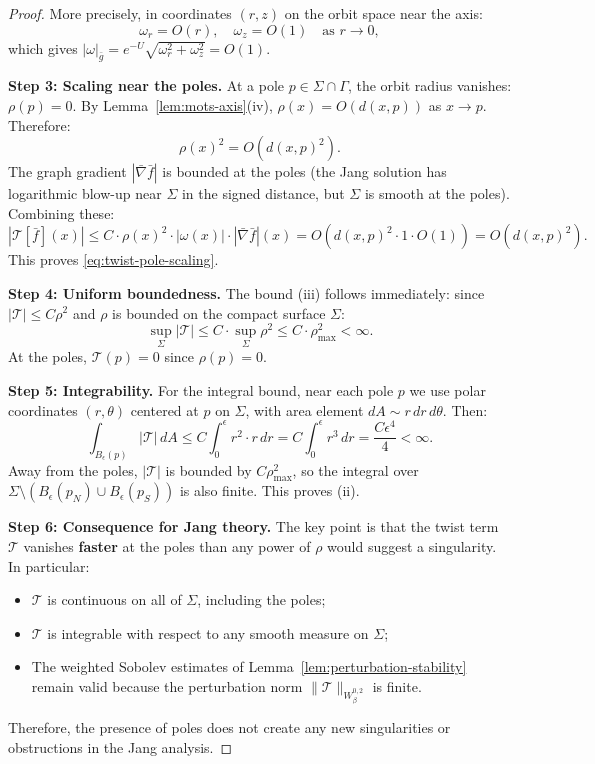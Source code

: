 \begin{proof}
More precisely, in coordinates $(r,z)$ on the orbit space near the axis:
\[
\omega_r = O(r), \quad \omega_z = O(1) \quad \text{as } r \to 0,
\]
which gives $|\omega|_{\bar{g}} = e^{-U}\sqrt{\omega_r^2 + \omega_z^2} = O(1)$.

\textbf{Step 3: Scaling near the poles.}
At a pole $p \in \Sigma \cap \Gamma$, the orbit radius vanishes: $\rho(p) = 0$. By Lemma~\ref{lem:mots-axis}(iv), $\rho(x) = O(d(x,p))$ as $x \to p$. Therefore:
\[
\rho(x)^2 = O(d(x,p)^2).
\]
The graph gradient $|\bar{\nabla}\bar{f}|$ is bounded at the poles (the Jang solution has logarithmic blow-up near $\Sigma$ in the signed distance, but $\Sigma$ is smooth at the poles). Combining these:
\[
|\mathcal{T}[\bar{f}](x)| \leq C \cdot \rho(x)^2 \cdot |\omega(x)| \cdot |\bar{\nabla}\bar{f}|(x) = O(d(x,p)^2 \cdot 1 \cdot O(1)) = O(d(x,p)^2).
\]
This proves \eqref{eq:twist-pole-scaling}.

\textbf{Step 4: Uniform boundedness.}
The bound (iii) follows immediately: since $|\mathcal{T}| \leq C\rho^2$ and $\rho$ is bounded on the compact surface $\Sigma$:
\[
\sup_\Sigma |\mathcal{T}| \leq C \cdot \sup_\Sigma \rho^2 \leq C \cdot \rho_{\max}^2 < \infty.
\]
At the poles, $\mathcal{T}(p) = 0$ since $\rho(p) = 0$.

\textbf{Step 5: Integrability.}
For the integral bound, near each pole $p$ we use polar coordinates $(r, \theta)$ centered at $p$ on $\Sigma$, with area element $dA \sim r \, dr \, d\theta$. Then:
\[
\int_{B_\epsilon(p)} |\mathcal{T}| \, dA \leq C \int_0^\epsilon r^2 \cdot r \, dr = C \int_0^\epsilon r^3 \, dr = \frac{C\epsilon^4}{4} < \infty.
\]
Away from the poles, $|\mathcal{T}|$ is bounded by $C\rho_{\max}^2$, so the integral over $\Sigma \setminus (B_\epsilon(p_N) \cup B_\epsilon(p_S))$ is also finite. This proves (ii).

\textbf{Step 6: Consequence for Jang theory.}
The key point is that the twist term $\mathcal{T}$ vanishes \textbf{faster} at the poles than any power of $\rho$ would suggest a singularity. In particular:
\begin{itemize}
    \item $\mathcal{T}$ is continuous on all of $\Sigma$, including the poles;
    \item $\mathcal{T}$ is integrable with respect to any smooth measure on $\Sigma$;
    \item The weighted Sobolev estimates of Lemma~\ref{lem:perturbation-stability} remain valid because the perturbation norm $\|\mathcal{T}\|_{W^{0,2}_\beta}$ is finite.
\end{itemize}
Therefore, the presence of poles does not create any new singularities or obstructions in the Jang analysis.
\end{proof}

